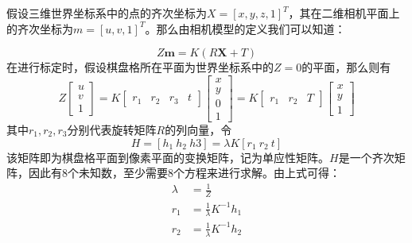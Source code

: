 \newcommand{\qczb}{齐次坐标}
假设三维世界坐标系中的点的\qczb 为\(X = [x,y,z,1]^T\)，其在二维相机平面上的\qczb 为\(m = [u,v,1]^T\)。那么由相机模型的定义我们可以知道：

\begin{equation}
    Z \bm{m} = K(R\bm{X} + T)
\end{equation}
在进行标定时，假设棋盘格所在平面为世界坐标系中的\(Z=0\)的平面，那么则有
\begin{equation}
Z\left[ \begin{array}{c} u \\ v \\ 1 \end{array} \right] = K\left[ 
    \begin{array}{cccc} r_1 & r_2 & r_3 & t\end{array}
    \right]
    \left[ 
    \begin{array}{c}x \\y \\0 \\1\end{array}
    \right]=K
    \left[ 
    \begin{array}{cccc} r_1 & r_2 & T\end{array}
    \right]
    \left[ 
    \begin{array}{c}x \\y \\1\end{array}
    \right]
\end{equation}
其中\(r_1,r_2,r_3\)分别代表旋转矩阵\(R\)的列向量，令
\begin{equation}
    H=[h_1\ h_2\ h3] = \lambda K[r_1\ r_2\ t]
\end{equation}
该矩阵即为棋盘格平面到像素平面的变换矩阵，记为单应性矩阵。\(H\)是一个齐次矩阵，因此有8个未知数，至少需要8个方程来进行求解。由上式可得：
\begin{align}
    \lambda &= \frac{1}{Z} \\
    r_1 &= \frac{1}{\lambda} K^{-1}h_1 \\
    r_2 &= \frac{1}{\lambda} K^{-1}h_2
\end{align}

